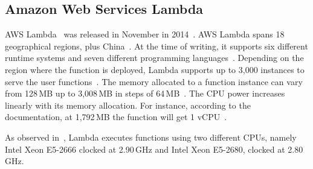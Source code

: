 
\subsection{Amazon Web Services Lambda}
\label{sec:ss:aws}

\gls{AWS} Lambda~\cite{AWSLambda} was released in November in 2014~\cite{AWSLambdaRelease}. 
\gls{AWS} Lambda spans 18 geographical regions, plus China~\cite{AWSRegions}. 
At the time of writing, it supports six different runtime systems and seven different programming languages~\cite{AWSLambdaLanguages}. 
Depending on the region where the function is deployed, Lambda supports up to 3,000 instances to serve the user functions~\cite{AWSLambdaScaling}. 
The memory allocated to a function instance can vary from 128\,\gls{MB} up to 3,008\,\gls{MB} in steps of 64\,\gls{MB}~\cite{AWSLambdaConfig}. 
The \gls{CPU} power increases linearly with its memory allocation.
For instance, according to the documentation, at 1,792\,\gls{MB} the function will get 1 \gls{vCPU}~\cite{AWSLambdaConfig}. %

As observed in~\cite{216063}, Lambda executes functions using two different \gls{CPU}s, namely Intel Xeon E5-2666 clocked at 2.90\,\gls{GHz} and Intel Xeon E5-2680, clocked at 2.80\,\gls{GHz}.

